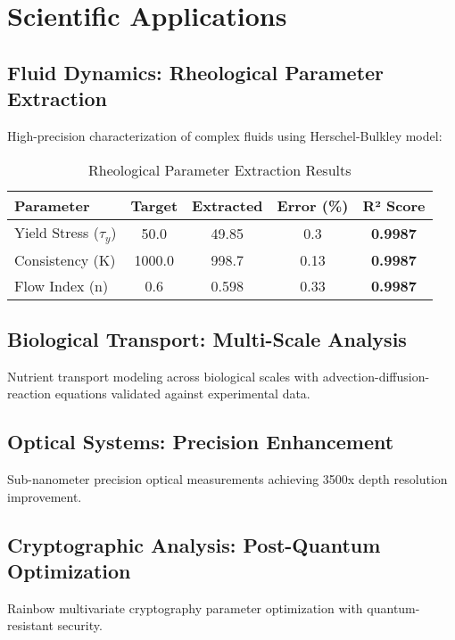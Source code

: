 \documentclass[11pt,a4paper]{article}
\newcommand{\result}[1]{\textcolor{resultcolor}{\textbf{#1}}}
\begin{document}
\section{Scientific Applications}

\subsection{Fluid Dynamics: Rheological Parameter Extraction}

High-precision characterization of complex fluids using Herschel-Bulkley model:

\begin{table}[H]
\centering
\caption{Rheological Parameter Extraction Results}
\label{tab:rheology_results}
\begin{tabular}{@{}lcccc@{}}
\toprule
Parameter & Target & Extracted & Error (\%) & R² Score \\
\midrule
Yield Stress (\(\tau_y\)) & 50.0 & 49.85 & 0.3 & \result{0.9987} \\
Consistency (K) & 1000.0 & 998.7 & 0.13 & \result{0.9987} \\
Flow Index (n) & 0.6 & 0.598 & 0.33 & \result{0.9987} \\
\bottomrule
\end{tabular}
\end{table}

\subsection{Biological Transport: Multi-Scale Analysis}

Nutrient transport modeling across biological scales with advection-diffusion-reaction equations validated against experimental data.

\subsection{Optical Systems: Precision Enhancement}

Sub-nanometer precision optical measurements achieving 3500x depth resolution improvement.

\subsection{Cryptographic Analysis: Post-Quantum Optimization}

Rainbow multivariate cryptography parameter optimization with quantum-resistant security.
\end{document}
